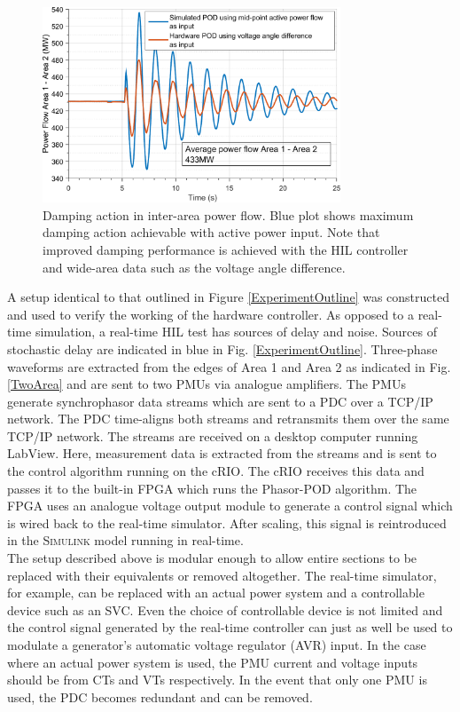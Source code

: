 \documentclass[a4paper, 10 pt, conference]{IEEEtran}
\begin{document}
\begin{figure}[htb]
	\includegraphics[width=3.5in]{SVC_ResponseComparison_Labelled.pdf} 
	\caption{Damping action in inter-area power flow. Blue plot shows maximum damping action achievable with active power input. Note that improved damping performance is achieved with the HIL controller and wide-area data such as the voltage angle difference.}
	\label{HILGraph}
\end{figure}

A setup identical to that outlined in Figure \ref{ExperimentOutline} was constructed and used to verify the working of the hardware controller. As opposed to a real-time simulation, a real-time HIL test has sources of delay and noise. Sources of stochastic delay are indicated in blue in Fig. \ref{ExperimentOutline}. Three-phase waveforms are extracted from the edges of Area 1 and Area 2 as indicated in Fig. \ref{TwoArea} and are sent to two PMUs via analogue amplifiers. The PMUs generate synchrophasor data streams which are sent to a PDC over a TCP/IP network. The PDC time-aligns both streams and retransmits them over the same TCP/IP network. The streams are received on a desktop computer running LabView. Here, measurement data is extracted from the streams and is sent to the control algorithm running on the cRIO. The cRIO receives this data and passes it to the built-in FPGA which runs the Phasor-POD algorithm. The FPGA uses an analogue voltage output module to generate a control signal which is wired back to the real-time simulator. After scaling, this signal is reintroduced in the \textsc{Simulink} model running in real-time.\\

The setup described above is modular enough to allow entire sections to be replaced with their equivalents or removed altogether. The real-time simulator, for example, can be replaced with an actual power system and a controllable device such as an SVC. Even the choice of controllable device is not limited and the control signal generated by the real-time controller can just as well be used to modulate a generator's automatic voltage regulator (AVR) input. In the case where an actual power system is used, the PMU current and voltage inputs should be from CTs and VTs respectively. In the event that only one PMU is used, the PDC becomes redundant and can be removed.\\
\end{document}
